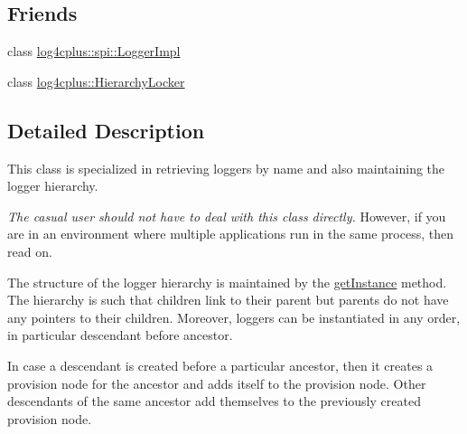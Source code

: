 \subsection*{Friends}
\begin{DoxyCompactItemize}
\item 
class \hyperlink{classlog4cplus_1_1Hierarchy_a8448132462ee76feacd2f66a641d3698}{log4cplus\-::spi\-::\-Logger\-Impl}
\item 
class \hyperlink{classlog4cplus_1_1Hierarchy_abb1f3e29e548cb77cdea6e6499167e15}{log4cplus\-::\-Hierarchy\-Locker}
\end{DoxyCompactItemize}


\subsection{Detailed Description}
This class is specialized in retrieving loggers by name and also maintaining the logger hierarchy.

{\itshape The casual user should not have to deal with this class directly.} However, if you are in an environment where multiple applications run in the same process, then read on.

The structure of the logger hierarchy is maintained by the \hyperlink{classlog4cplus_1_1Hierarchy_ae255db6950dff79f2679acb9c2fe55e1}{get\-Instance} method. The hierarchy is such that children link to their parent but parents do not have any pointers to their children. Moreover, loggers can be instantiated in any order, in particular descendant before ancestor.

In case a descendant is created before a particular ancestor, then it creates a provision node for the ancestor and adds itself to the provision node. Other descendants of the same ancestor add themselves to the previously created provision node. 

